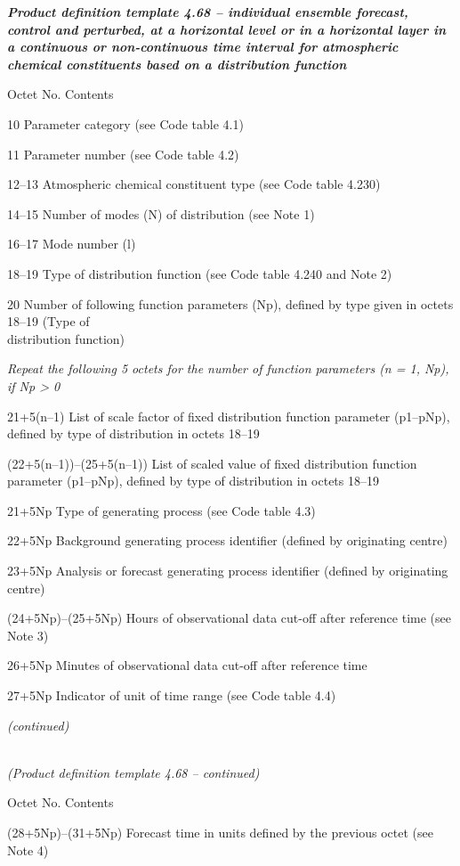 \emph{\textbf{Product definition template 4.68 -- individual ensemble forecast, control and perturbed, at a horizontal level or in a horizontal layer in a continuous or non-continuous time interval for atmospheric chemical constituents based on a distribution function}}

Octet No. Contents

10 Parameter category (see Code table 4.1)

11 Parameter number (see Code table 4.2)

12--13 Atmospheric chemical constituent type (see Code table 4.230)

14--15 Number of modes (N) of distribution (see Note 1)

16--17 Mode number (l)

18--19 Type of distribution function (see Code table 4.240 and Note 2)

20 Number of following function parameters (Np), defined by type given in octets 18--19 (Type of\\
distribution function)

\emph{Repeat the following 5 octets for the number of function parameters (n = 1, Np), if Np \textgreater{} 0}

21+5(n--1) List of scale factor of fixed distribution function parameter (p1--pNp), defined by type of distribution in octets 18--19

(22+5(n--1))--(25+5(n--1)) List of scaled value of fixed distribution function parameter (p1--pNp), defined by type of distribution in octets 18--19

21+5Np Type of generating process (see Code table 4.3)

22+5Np Background generating process identifier (defined by originating centre)

23+5Np Analysis or forecast generating process identifier (defined by originating centre)

(24+5Np)--(25+5Np) Hours of observational data cut-off after reference time (see Note 3)

26+5Np Minutes of observational data cut-off after reference time

27+5Np Indicator of unit of time range (see Code table 4.4)

\emph{(continued)}

\emph{\\
(Product definition template 4.68 -- continued)}

Octet No. Contents

(28+5Np)--(31+5Np) Forecast time in units defined by the previous octet (see Note 4)

